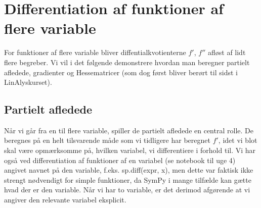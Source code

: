 \documentclass[letterpaper,10pt,english]{jupyterBook}
\begin{document}
\begin{sphinxVerbatim}[commandchars=\\\{\}]
                       
                 
              
                
                    
      
\end{sphinxVerbatim}


\section{Differentiation af funktioner af flere variable}
\label{\detokenize{notebooks/sympy/Notebook_FlereVar_analyse:differentiation-af-funktioner-af-flere-variable}}
For funktioner af flere variable bliver diffentialkvotienterne \(f'\), \(f''\) afløst af lidt flere begreber. Vi vil i det følgende demonstrere hvordan man beregner partielt afledede, gradienter og Hesse\sphinxhyphen{}matricer (som dog først bliver berørt til sidst i LinAlys\sphinxhyphen{}kurset).


\subsection{Partielt afledede}
\label{\detokenize{notebooks/sympy/Notebook_FlereVar_analyse:partielt-afledede}}
Når vi går fra en til flere variable, spiller de partielt afledede en central rolle. De beregnes på en helt tilsvarende måde som vi tidligere har beregnet \(f'\), idet vi blot skal være opmærksomme på, hvilken variabel, vi differentiere i forhold til. Vi har også ved differentiation af funktioner af en variabel (se notebook til uge 4) angivet navnet på den variable, f.eks. sp.diff(expr, x), men dette var faktisk ikke strengt nødvendigt for simple funktioner, da SymPy i mange tilfælde kan gætte hvad der er den variable. Når vi har to variable, er det derimod afgørende at vi angiver den relevante variabel eksplicit.
\end{document}
